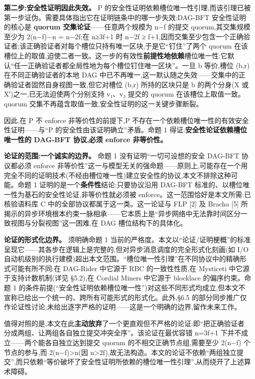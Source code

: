 \documentclass[UTF8,fontset=windows,a4paper,11pt]{ctexart}
\begin{document}
\textbf{第二步:安全性证明因此失效。} P
的安全性证明依赖槽位唯一性引理,而该引理已被第一步证伪。需要具体指出它在证明链条中的哪一步失效:DAG-BFT
安全性证明的核心是 \textbf{quorum 交集论证}------任意两个规模为 n−f
的提交 quorum,其交集规模至少为 2(n−f)−n = n−2f;在 n≥3f+1 时 n−2f ≥
f+1,因而交集至少包含一个正确验证者;该正确验证者对每个槽位只持有唯一区块,于是它``钉住''了两个
quorum
在该槽位上的取值,迫使二者一致。这一步的有效性\textbf{前提性地依赖}槽位唯一性:它默认``任一正确验证者都全局性地为每个槽位钉住唯一区块''。一旦
b 等价,槽位 (b,r) 在不同正确验证者的本地 DAG
中已不再唯一,这一默认随之失效------交集中的正确验证者固然自身视图一致,但它对槽位
(b,r) 所持的区块只是 b 的两个分身(X 或 X′)之一,已无法迫使两个分别支持
v₁、v₂ 提交的 quorum 在该槽位上取值一致。quorum
交集不再蕴含取值一致,安全性证明的这一关键步骤断裂。

因此,在 P 不 enforce 非等价性的前提下,P
不存在一个依赖槽位唯一性的有效安全性证明------与``P
的安全性由该证明确立''矛盾。命题 1
得证:\textbf{安全性论证依赖槽位唯一性的 DAG-BFT 协议,必须 enforce
非等价性。}

\textbf{论证的范围:一个诚实的边界。} 命题 1 没有证明``一切可设想的安全
DAG-BFT 协议都必须 enforce
非等价性''这一与模型无关的强命题------原则上,可能存在一个用完全不同的证明技术(不经由槽位唯一性)建立安全性的协议,本文不排除这种可能。命题
1 证明的是一个\textbf{条件性}结论:只要协议沿用 DAG-BFT
标准的、以槽位唯一性为基石的安全性论证,非等价性就必须被
enforce。这一范围恰好是本文所需:已核验语料库 C
中的全部协议都属于这一类。这一论证与 FLP {[}2{]} 及 Bracha {[}5{]}
所揭示的异步环境根本约束一脉相承------它本质上是``异步网络中无法靠时间区分一致视图与分裂视图''这一困难,在
DAG 槽位结构下的具体化。

\textbf{论证的形式化边界。} 须明确命题 1 当前的严格度。本文以``论证/证明梗概''的标准呈现它------其各步在逻辑上是完整的,但对异步消息调度的完全形式化刻画(如 I/O 自动机级别的执行建模)超出本文范围。``槽位唯一性引理''在不同协议中的精确形式可能有所不同:在 DAG-Rider 中它源于 RBC 的一致性性质,在 Mysticeti 中它源于支持计数机制(详见 §5.2),在 Cordial Miners 中它源于 blocklace 的偏序约束。命题 1 的条件前提(``安全性证明依赖槽位唯一性'')对这些不同形式均成立,但本文不宣称已给出一个统一的、跨所有可能形式的形式化。此外,§6.5 的部分同步推广仅作论证性讨论,未给出逐字严格的证明------这是一个明确的边界,留作未来工作。

值得对照的是,本文在此\textbf{主动放弃}了一个更直观但不严格的论证:即``把正确验证者分成两组、让两组各自独立提交冲突全序''。该论证在最优容错
n=3f+1 下并不成立------两个能各自独立达到提交 quorum
的不相交正确节点组,需要至少 2(n−f) 个节点的参与,而
2(n−f)\textgreater n(因
n\textgreater2f),故无法构造。本文的论证不依赖``两组独立提交'',而只依赖``等价破坏了安全性证明所依赖的槽位唯一性引理'',从而绕开了上述算术障碍。
\end{document}

